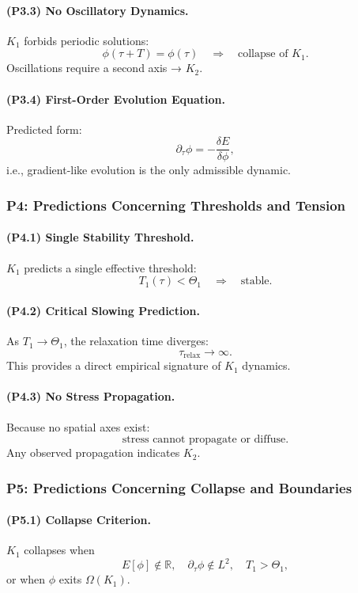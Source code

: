 \paragraph{(P3.3) No Oscillatory Dynamics.}
$K_1$ forbids periodic solutions:
\[
\phi(\tau + T) = \phi(\tau)
\quad\Rightarrow\quad \text{collapse of } K_1.
\]
Oscillations require a second axis → $K_2$.

\paragraph{(P3.4) First-Order Evolution Equation.}
Predicted form:
\[
\partial_\tau \phi = -\frac{\delta E}{\delta\phi},
\]
i.e., gradient-like evolution is the only admissible dynamic.

\subsubsection{P4: Predictions Concerning Thresholds and Tension}

\paragraph{(P4.1) Single Stability Threshold.}
$K_1$ predicts a single effective threshold:
\[
T_1(\tau) < \Theta_1
\quad\Rightarrow\quad \text{stable}.
\]

\paragraph{(P4.2) Critical Slowing Prediction.}
As $T_1 \to \Theta_1$, the relaxation time diverges:
\[
\tau_{\mathrm{relax}} \to \infty.
\]
This provides a direct empirical signature of $K_1$ dynamics.

\paragraph{(P4.3) No Stress Propagation.}
Because no spatial axes exist:
\[
\text{stress cannot propagate or diffuse}.
\]
Any observed propagation indicates $K_2$.

\subsubsection{P5: Predictions Concerning Collapse and Boundaries}

\paragraph{(P5.1) Collapse Criterion.}
$K_1$ collapses when
\[
E[\phi] \notin \mathbb{R},\quad
\partial_\tau \phi \notin L^2,\quad
T_1 > \Theta_1,
\]
or when $\phi$ exits $\Omega(K_1)$.

